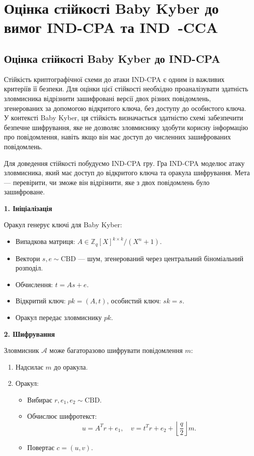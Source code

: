 \section{Оцінка стійкості Baby Kyber до вимог IND-CPA та IND~-CCA}

\subsection*{Оцінка стійкості Baby Kyber до IND-CPA}

Стійкість криптографічної схеми до атаки IND-CPA є одним із важливих критеріїв її безпеки. Для оцінки цієї стійкості необхідно проаналізувати здатність зловмисника відрізнити зашифровані версії двох різних повідомлень, згенерованих за допомогою відкритого ключа, без доступу до особистого ключа. У контексті Baby Kyber, ця стійкість визначається здатністю схемі забезпечити безпечне шифрування, яке не дозволяє зловмиснику здобути корисну інформацію про повідомлення, навіть якщо він має доступ до численних зашифрованих повідомлень.

Для доведення стійкості побудуємо IND-CPA гру. Гра IND-CPA моделює атаку зловмисника, який має доступ до відкритого ключа та оракула шифрування. Мета --- перевірити, чи зможе він відрізнити, яке з двох повідомлень було зашифроване.

\textbf{1. Ініціалізація}

Оракул генерує ключі для Baby Kyber:
\begin{itemize}
    \item Випадкова матриця: $A \in \mathbb{Z}_q[X]^{k \times k} / (X^n + 1)$.
    \item Вектори $s, e \sim \text{CBD}$ --- шум, згенерований через центральний біноміальний розподіл.
    \item Обчислення: $t = A s + e$.
    \item Відкритий ключ: $pk = (A, t)$, особистий ключ: $sk = s$.
    \item Оракул передає зловмиснику $pk$.
\end{itemize}

\textbf{2. Шифрування}

Зловмисник $\mathcal{A}$ може багаторазово шифрувати повідомлення $m$:
\begin{enumerate}
    \item Надсилає $m$ до оракула.
    \item Оракул:
    \begin{itemize}
        \item Вибирає $r, e_1, e_2 \sim \text{CBD}$.
        \item Обчислює шифротекст:
        \[
        u = A^T r + e_1,\quad v = t^T r + e_2 + \left\lfloor \frac{q}{2} \right\rfloor m.
        \]
        \item Повертає $c = (u, v)$.
    \end{itemize}
\end{enumerate}

